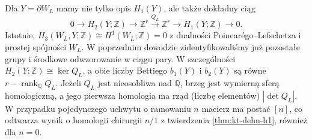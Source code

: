 \begin{uwaga}
Dla $Y=\partial W_L$ mamy nie tylko opis $H_1(Y)$,
ale także dokładny ciąg
\[
0\longrightarrow H_2(Y;\mathbb Z)
\longrightarrow \mathbb Z^r
\xrightarrow{Q_L}\mathbb Z^r
\longrightarrow H_1(Y;\mathbb Z)
\longrightarrow0.
\]
Istotnie, $H_3(W_L,Y;\mathbb Z)\cong H^1(W_L;\mathbb Z)=0$
z dualności Poincarégo--Lefschetza i prostej spójności
$W_L$. W poprzednim dowodzie zidentyfikowaliśmy już
pozostałe grupy i środkowe odwzorowanie w ciągu pary.
W szczególności $H_2(Y;\mathbb Z)\cong\ker Q_L$,
a obie liczby Bettiego $b_1(Y)$ i $b_2(Y)$ są równe
$r-\operatorname{rank}_{\mathbb Q}Q_L$.
Jeżeli $Q_L$ jest nieosobliwa nad $\mathbb Q$, brzeg
jest wymierną sferą homologiczną, a jego pierwsza
homologia ma rząd (liczbę elementów) $|\det Q_L|$.
W przypadku pojedynczego uchwytu o ramowaniu $n$
macierz ma postać $[n]$, co odtwarza wynik o
homologii chirurgii $n/1$ z twierdzenia
\ref{thm:kt-dehn-h1}, również dla $n=0$.
\end{uwaga}

